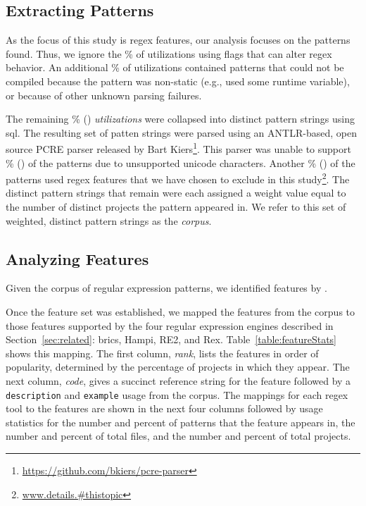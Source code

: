 \subsection{Extracting Patterns}
As the focus of this study is regex features, our analysis focuses on the patterns found. Thus,  we ignore the \%  of utilizations using flags that can alter regex behavior.  An additional \% of utilizations contained patterns that could not be compiled because the pattern was non-static (e.g., used some runtime variable), or because of other unknown parsing failures.

The remaining \% () \emph{utilizations} were collapsed into  distinct pattern strings using sql.  The resulting set of patten strings were parsed using an ANTLR-based, open source PCRE parser released by Bart Kiers\footnote{\url{https://github.com/bkiers/pcre-parser}}.  This parser was unable to support \% () of the patterns due to unsupported unicode characters.  Another \% () of the patterns used regex features that we have chosen to exclude in this study\footnote{\url{www.details.#thistopic}}.
  The  distinct pattern strings that remain were each assigned a weight value equal to the number of distinct projects the pattern appeared in.  We  refer to this set of weighted, distinct pattern strings as the \emph{corpus}.

\subsection{Analyzing Features}
\label{study:features}
Given the corpus of regular expression patterns, we identified features by .

Once the feature set was established, we mapped the features from the corpus to those features supported by the four regular expression engines described in Section~\ref{sec:related}: brics, Hampi, RE2, and Rex.
Table~\ref{table:featureStats} shows this mapping.
The first column, \emph{rank}, lists the features in order of popularity, determined by the percentage of projects in which they appear. The next column, \emph{code}, gives a succinct reference string for the feature followed by a {\tt description} and {\tt example} usage from the corpus. The mappings for each regex tool to the features are shown in the next four columns followed by usage statistics for the number and percent of patterns that the feature appears in, the number and percent of total files, and the number and percent of total projects.

